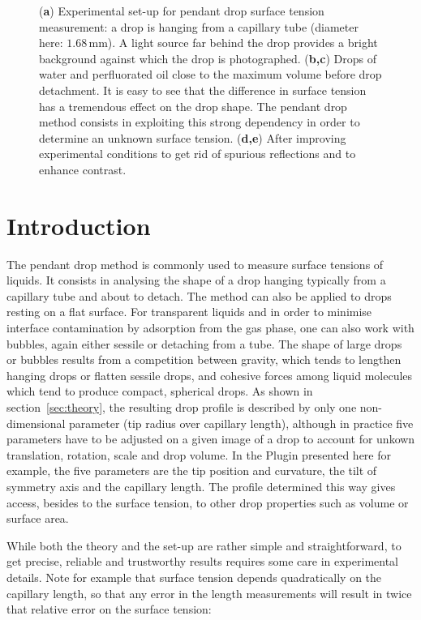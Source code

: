 \documentclass[fleqn]{scrartcl}
\newcommand{\subfig}[1]{\textbf{\textsf{#1}}}
\begin{document}
\begin{figure}
  \caption{(\subfig{a}) Experimental set-up for pendant drop surface
    tension measurement: a drop is hanging from a capillary tube
    (diameter here: $1.68\,$mm). A light source far behind the drop
    provides a bright background against which the drop is
    photographed. (\subfig{b,c}) Drops of water and perfluorated oil
    close to the maximum volume before drop detachment. It is easy to
    see that the difference in surface tension has a tremendous effect
    on the drop shape. The pendant drop method consists in exploiting
    this strong dependency in order to determine an unknown surface
    tension. (\subfig{d,e}) After improving experimental conditions to
    get rid of spurious reflections and to enhance contrast.}
  \label{fig:pendantdropphoto}
\end{figure}


\section{Introduction}
\label{sec:introduction}

The pendant drop method is commonly used to measure surface tensions
of liquids. It consists in analysing the shape of a drop hanging
typically from a capillary tube and about to detach. The method can
also be applied to drops resting on a flat surface. For transparent
liquids and in order to minimise interface contamination by adsorption
from the gas phase, one can also work with bubbles, again either
sessile or detaching from a tube. The shape of large drops or bubbles
results from a competition between gravity, which tends to lengthen
hanging drops or flatten sessile drops, and cohesive forces among
liquid molecules which tend to produce compact, spherical drops. As
shown in section~\ref{sec:theory}, the resulting drop profile
is described by only one non-dimensional parameter (tip radius over
capillary length), although in practice five parameters have to be
adjusted on a given image of a drop to account for unkown translation,
rotation, scale and drop volume. In the Plugin presented here for
example, the five parameters are the tip position and curvature, the
tilt of symmetry axis and the capillary length. The profile determined
this way gives access, besides to the surface tension, to other drop
properties such as volume or surface area.

While both the theory and the set-up are rather simple and
straightforward, to get precise, reliable and trustworthy results
requires some care in experimental details. Note for example that
surface tension depends quadratically on the capillary length, so that
any error in the length measurements will result in twice that
relative error on the surface tension:
\end{document}

